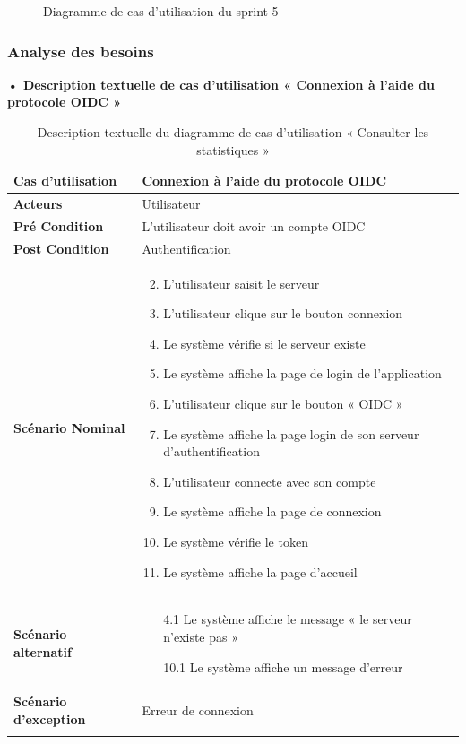 \begin{figure}[H]
  \centering
  \caption{Diagramme de cas d'utilisation du sprint 5}
  \label{fig:UseCaseDiagramSp51}
\end{figure}

\subsubsection{Analyse des besoins}
\textbf{•	Description textuelle de cas d'utilisation « Connexion à l'aide du protocole OIDC  »}

\begin{longtable}{|p{5cm}|p{10cm}|}
\hline
\textbf{Cas d'utilisation}&Connexion à l'aide du protocole OIDC\\
\hline
\textbf{Acteurs}&Utilisateur\\
\hline
\textbf{Pré Condition}&L'utilisateur doit avoir un compte OIDC\\
\hline
\textbf{Post Condition}&Authentification\\
\hline
\textbf{Scénario Nominal}&
\vspace{-\baselineskip}
\begin{enumerate}
  \setcounter{enumi}{1}
    \item L'utilisateur saisit le serveur
    \item L'utilisateur clique sur le bouton connexion
    \item Le système vérifie si le serveur existe
    \item Le système affiche la page de login de l'application
    \item L'utilisateur clique sur le bouton « OIDC »
    \item Le système affiche la page login de son serveur d'authentification
    \item L'utilisateur connecte avec son compte
    \item Le système affiche la page de connexion 
    \item Le système vérifie le token
    \item Le système affiche la page d'accueil 
  
\end{enumerate}\\
\hline
\textbf{Scénario alternatif}&
\vspace{-\baselineskip}
\begin{enumerate}
  \item [4.1] Le système affiche le message « le serveur n'existe pas »
  \item [10.1] Le système affiche un message d'erreur
\end{enumerate}\\
\hline
\textbf{Scénario d'exception}&Erreur de connexion\\
\hline
\caption{Description textuelle du diagramme de cas d'utilisation « Consulter les statistiques »}
\label{tab:use_case_oidc_connect}
\end{longtable}

